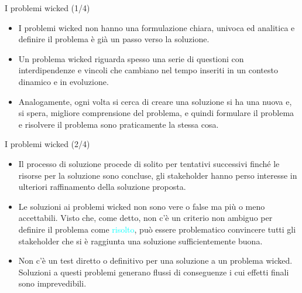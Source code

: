 \documentclass{beamer}
\begin{document}

\begin{frame}{\centerline{I problemi wicked (1/4)}}

\small
\begin{itemize}
\item I problemi wicked non hanno una formulazione chiara, univoca ed analitica e definire il problema \`{e} gi\`{a} un passo verso la soluzione.

\item Un problema wicked riguarda spesso una serie di questioni con interdipendenze e vincoli che cambiano nel tempo inseriti in un contesto dinamico e in evoluzione.

\item Analogamente, ogni volta si cerca di creare una soluzione si ha una nuova e, si spera, migliore comprensione del problema, e quindi formulare il problema e risolvere il problema sono praticamente la stessa cosa.


\end{itemize}

\end{frame}


\begin{frame}{\centerline{I problemi wicked (2/4)}}

\small
\begin{itemize}
\item Il processo di soluzione procede di solito per tentativi successivi finch\'{e} le risorse per la soluzione sono concluse, gli stakeholder hanno perso interesse in ulteriori raffinamento della soluzione proposta.

\item Le soluzioni ai problemi wicked non sono vere o false ma pi\`{u} o meno accettabili. Visto che, come detto, non c'\`{e} un criterio non ambiguo per definire il problema come \textcolor{cyan}{risolto}, pu\`{o} essere problematico convincere tutti gli stakeholder che si \`{e} raggiunta una soluzione sufficientemente buona.

\item Non c'\`{e} un test diretto o definitivo per una soluzione a un problema wicked. Soluzioni a questi problemi generano flussi di conseguenze i cui effetti finali sono imprevedibili.


\end{itemize}

\end{frame}
\end{document}
